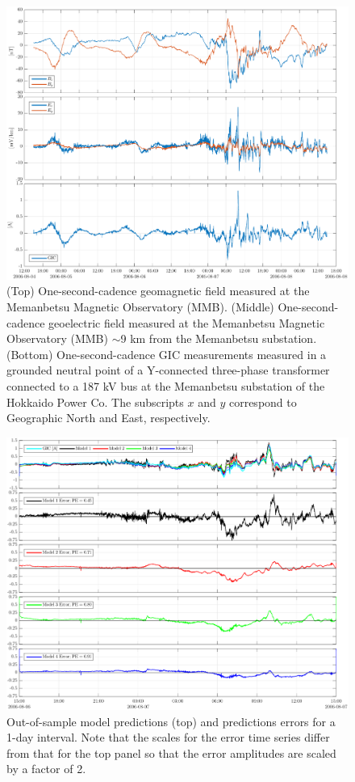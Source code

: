 \documentclass[draft,linenumbers]{agujournal2018}
\begin{document}
\begin{figure}[h]
\centering
\includegraphics[width=\textwidth]{figures/plot_raw_All_20060805.pdf}
\caption{(Top) One-second-cadence geomagnetic field measured at the Memanbetsu Magnetic Observatory (MMB). (Middle) One-second-cadence geoelectric field measured at the Memanbetsu Magnetic Observatory (MMB) $\sim$9 km from the Memanbetsu substation. (Bottom) One-second-cadence GIC measurements measured in a grounded neutral point of a Y-connected three-phase transformer connected to a 187 kV bus at the Memanbetsu substation of the Hokkaido Power Co. The subscripts $x$ and $y$ correspond to Geographic North and East, respectively.}
\label{sample}
\end{figure}

\begin{figure}[h]
\centering
\includegraphics[width=\textwidth]{figures/plot_model_predictions-MeanModel-2006-08-06.pdf}
\caption{Out-of-sample model predictions (top) and predictions errors for a 1-day interval. Note that the scales for the error time series differ from that for the top panel so that the error amplitudes are scaled by a factor of 2.}
\label{predictions}
\end{figure}
\end{document}
